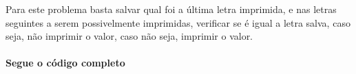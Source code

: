 Para este problema basta salvar qual foi a última letra imprimida, e nas letras seguintes a serem possivelmente imprimidas, verificar se é igual a letra salva, caso seja, não imprimir o valor, caso não seja, imprimir o valor.
\paragraph{Segue o código completo}
\begin{mdframed}[linewidth=0pt,backgroundcolor=codebgcolor]
    \inputminted[breaklines]{python}{../src/apaxiaaans/apaxiaaans.py}
\end{mdframed}